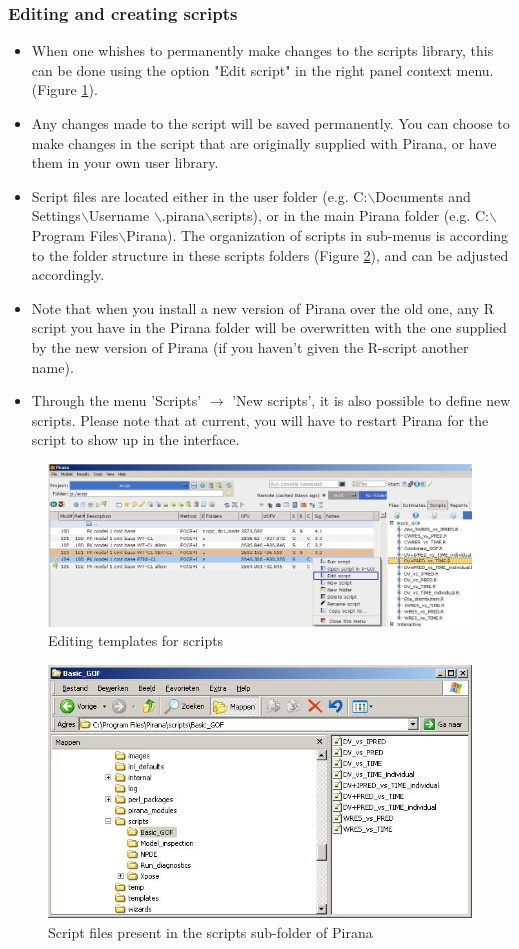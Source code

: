 \subsubsection*{Editing and creating scripts}
\begin{itemize}
\item When one whishes to permanently make changes to the scripts
  library, this can be done using the option "Edit script" in the right panel context menu.
  (Figure \ref{fig:Fig6}).
\item Any changes made to the script will be saved permanently. You
  can choose to make changes in the script that are originally
  supplied with Pirana, or have them in your own user library.
\item Script files are located either in the user folder
  (e.g. C:$\backslash$Documents and
  Settings$\backslash$Username
$\backslash$.pirana$\backslash$scripts), or in the
  main Pirana folder (e.g. C:$\backslash$Program
  Files$\backslash$Pirana). The organization of scripts in sub-menus
  is according to the folder structure in these scripts folders
  (Figure \ref{fig:Fig7}), and can be adjusted accordingly.
\item Note that when you install a new version of Pirana over the old
  one, any R script you have in the Pirana folder will be overwritten
  with the one supplied by the new version of Pirana (if you haven't
  given the R-script another name).
\item Through the menu 'Scripts' $\rightarrow$ 'New scripts', it is
  also possible to define new scripts. Please note that at current,
  you will have to restart Pirana for the script to show up in the
  interface.
\end{itemize}

\begin{figure}[h] \centering
    \includegraphics[scale=.3]{images/graphs_6.jpg}
    \caption{Editing templates for scripts\label{fig:Fig6}}
\end{figure}

\begin{figure}[h] \centering
    \includegraphics[scale=.5]{images/graphs_7.jpg}
    \caption{Script files present in the scripts sub-folder of Pirana\label{fig:Fig7}}
\end{figure}


